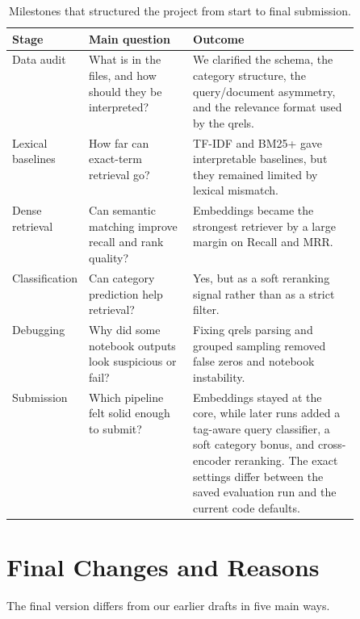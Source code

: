 \documentclass[11pt,a4paper]{article}
\begin{document}
\begin{table}[H]
\centering
\small
\begin{tabularx}{\linewidth}{P{0.20\linewidth}P{0.30\linewidth}Y}
\toprule
Stage & Main question & Outcome \\
\midrule
Data audit & What is in the files, and how should they be interpreted? & We clarified the schema, the category structure, the query/document asymmetry, and the relevance format used by the qrels. \\
Lexical baselines & How far can exact-term retrieval go? & TF-IDF and BM25+ gave interpretable baselines, but they remained limited by lexical mismatch. \\
Dense retrieval & Can semantic matching improve recall and rank quality? & Embeddings became the strongest retriever by a large margin on Recall and MRR. \\
Classification & Can category prediction help retrieval? & Yes, but as a soft reranking signal rather than as a strict filter. \\
Debugging & Why did some notebook outputs look suspicious or fail? & Fixing qrels parsing and grouped sampling removed false zeros and notebook instability. \\
Submission & Which pipeline felt solid enough to submit? & Embeddings stayed at the core, while later runs added a tag-aware query classifier, a soft category bonus, and cross-encoder reranking. The exact settings differ between the saved evaluation run and the current code defaults. \\
\bottomrule
\end{tabularx}
\caption{Milestones that structured the project from start to final submission.}
\label{tab:roadmap}
\end{table}

\section{Final Changes and Reasons}

The final version differs from our earlier drafts in five main ways.
\end{document}
